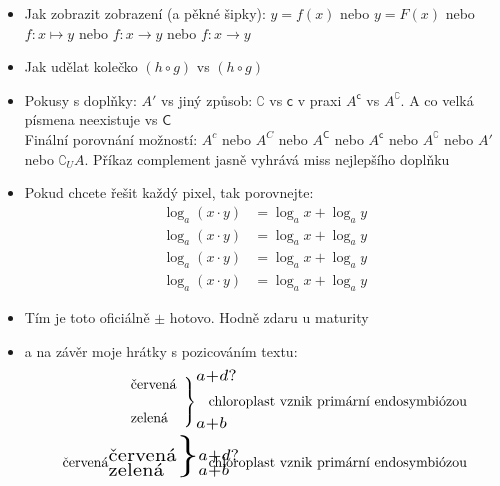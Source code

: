 \documentclass[12pt]{article}
\begin{document}
\begin{itemize}
\item Jak zobrazit zobrazení (a pěkné šipky):  $y = f(x) $ nebo $ y = F(x) $ nebo $ f: x \mapsto y $ nebo $ f: x \to y $ nebo $ f: x \rightarrow y$ \
\item Jak udělat kolečko $ (h ∘ g)$ vs $ (h \circ g)$
\item Pokusy s doplňky: $A'$ vs  jiný způsob:  $\complement$ vs $\mathsf{c}$ v praxi $A^\mathsf{c}$ vs $A^\complement$. A co velká písmena %
neexistuje vs $\mathsf{C}$\\
Finální porovnání možností: $A^c$ nebo $A^C$ nebo $A^\mathsf{C}$ nebo $A^\mathsf{c}$ nebo $A^\complement$ nebo $A'$ nebo $\complement_U A$. Příkaz complement jasně vyhrává miss nejlepšího doplňku
\item Pokud chcete řešit každý pixel, tak porovnejte:
\begin{align*}
\log_a (x \cdot y) &= \log_a x + \log_a y\\
\log_a{(x \cdot y)} &= \log_a{x} + \log_a{y}\\
\log_a{\left(x \cdot y \right)} &= \log_a{x} + \log_a{y}\\
\log_a \left(x \cdot y \right) &= \log_a x + \log_a y
\end{align*}
\item Tím je toto oficiálně $\pm$ hotovo. Hodně zdaru u maturity
\item a na závěr moje hrátky s pozicováním textu:
\begin{align*}
 \left.
    \begin{array}{ll}
       \text{červená} \\
       \\
       \text{zelená}
    \end{array}
\right\}_{\scaleto{a+b}{9pt}}^{\scaleto{a+d?}{9pt}} \mspace{-40mu} \text{chloroplast vznik primární endosymbiózou}\\
       \text{červená}
 {^{\scaleto{\text{červená}}{9pt}}_{\scaleto{\text{zelená}}{9pt}}}\scaleto{ \}}{30pt}
_{\scaleto{a+b}{9pt}}^{\scaleto{a+d?}{9pt}} \mspace{-40mu} \text{chloroplast vznik primární endosymbiózou}
\end{align*} %
\end{itemize}
\end{document}
